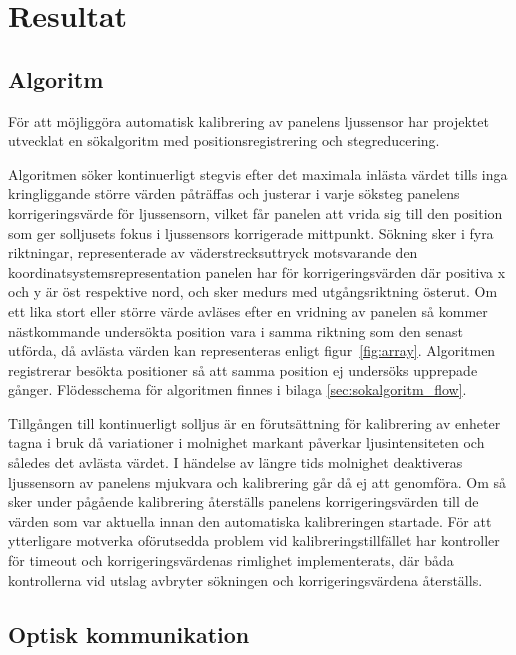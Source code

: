 \section{Resultat} %
\label{sec:resultat}
    \subsection{Algoritm} %
    \label{sub:algoritm}
        För att möjliggöra automatisk kalibrering av panelens ljussensor har projektet utvecklat en sökalgoritm med positionsregistrering och stegreducering. \bigskip

        Algoritmen söker kontinuerligt stegvis efter det maximala inlästa värdet tills inga kringliggande större värden påträffas och justerar i varje söksteg panelens korrigeringsvärde för ljussensorn, vilket får panelen att vrida sig till den position som ger solljusets fokus i ljussensors korrigerade mittpunkt. Sökning sker i fyra riktningar, representerade av väderstrecksuttryck motsvarande den koordinatsystemsrepresentation panelen har för korrigeringsvärden där positiva x och y är öst respektive nord, och sker medurs med utgångsriktning österut. Om ett lika stort eller större värde avläses efter en vridning av panelen så kommer nästkommande undersökta position vara i samma riktning som den senast utförda, då avlästa värden kan representeras enligt figur~\ref{fig:array}. Algoritmen registrerar besökta positioner så att samma position ej undersöks upprepade gånger. Flödesschema för algoritmen finnes i bilaga \ref{sec:sokalgoritm_flow}. \bigskip

        Tillgången till kontinuerligt solljus är en förutsättning för kalibrering av enheter tagna i bruk då variationer i molnighet markant påverkar ljusintensiteten och således det avlästa värdet. I händelse av längre tids molnighet deaktiveras ljussensorn av panelens mjukvara och kalibrering går då ej att genomföra. Om så sker under pågående kalibrering återställs panelens korrigeringsvärden till de värden som var aktuella innan den automatiska kalibreringen startade. För att ytterligare motverka oförutsedda problem vid kalibreringstillfället har kontroller för timeout och korrigeringsvärdenas rimlighet implementerats, där båda kontrollerna vid utslag avbryter sökningen och korrigeringsvärdena återställs.

    \subsection{Optisk kommunikation} %
    \label{sub:optisk_kommunikation}
